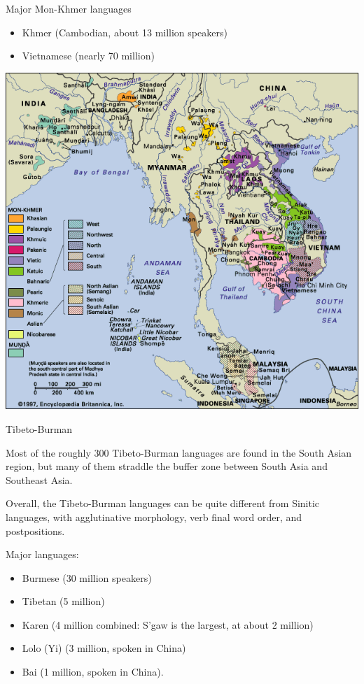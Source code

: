 \documentclass{beamer}
\begin{document}
\begin{frame}{Major Mon-Khmer languages}
\begin{itemize}
\item Khmer (Cambodian, about 13 million speakers)
\item Vietnamese (nearly 70 million)
\end{itemize}

\begin{center}
\includegraphics[height=.7\textheight]{pics/image6.png}
\end{center}
\end{frame}

\begin{frame}{Tibeto-Burman}

Most of the roughly 300 Tibeto-Burman languages are found in the South Asian
region, but many of them straddle the buffer zone between South Asia and
Southeast Asia.

Overall, the Tibeto-Burman languages can be quite different from Sinitic
languages, with agglutinative morphology, verb final word order, and postpositions.

Major languages:

\begin{itemize}
\item Burmese (30 million speakers)
\item Tibetan (5 million)
\item Karen  (4 million combined: S'gaw is
the largest, at about 2 million)
\item Lolo (Yi) (3 million, spoken in China)
\item Bai (1 million, spoken in China).
\end{itemize}

  
\end{frame}
\end{document}
